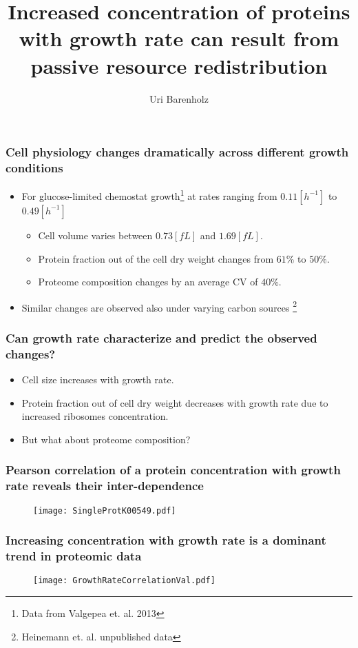 \documentclass{beamer}
\title{Increased concentration of proteins with growth rate can result from passive resource redistribution}
\author{Uri Barenholz}
\begin{document}
\maketitle
\begin{frame}
\frametitle{Cell physiology changes dramatically across different growth conditions}
\begin{itemize}
\item For glucose-limited chemostat growth\footnote{Data from Valgepea et. al. 2013} at rates ranging from $0.11 [h^{-1}]$ to $0.49 [h^{-1}]$
\begin{itemize}
\item Cell volume varies between $0.73 [fL]$ and $1.69 [fL]$.
\item Protein fraction out of the cell dry weight changes from $61\%$ to $50\%$.
\item Proteome composition changes by an average CV of $40\%$.
\end{itemize}
\item Similar changes are observed also under varying carbon sources
\footnote{Heinemann et. al. unpublished data}
\end{itemize}
\end{frame}

\begin{frame}
\frametitle{Can growth rate characterize and predict the observed changes?}
\begin{itemize}
\item Cell size increases with growth rate.
\item Protein fraction out of cell dry weight decreases with growth rate due to increased ribosomes concentration.
\item But what about proteome composition?
\end{itemize}
\end{frame}

\begin{frame}
\frametitle{Pearson correlation of a protein concentration with growth rate reveals their inter-dependence}
\begin{figure}[h!]
\centering
\texttt{[image: SingleProtK00549.pdf]}
\end{figure}
\end{frame}

\begin{frame}
\frametitle{Increasing concentration with growth rate is a dominant trend in proteomic data}
\begin{figure}[h!]
\centering
\texttt{[image: GrowthRateCorrelationVal.pdf]}
\end{figure}
\end{frame}
\end{document}
